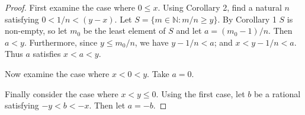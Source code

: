 \documentclass[12pt]{article}
\begin{document}
\begin{proof}
First examine the case where $0 \leq x$.  Using Corollary 2, find a natural $n$ satisfying $0 < 1/n < (y-x)$.  Let $S = \{ m \in \mathbb{N} : m/n \geq y \}$.  By Corollary 1 $S$ is non-empty, so let $m_0$ be the least element of $S$ and let $a = (m_0-1)/n$.  Then $a< y$.  Furthermore, since $y \leq m_0/n$, we have $y - 1/n < a$; and $x < y - 1/n < a$.  Thus $a$ satisfies $x < a < y$.

Now examine the case where $x < 0 < y$.  Take $a = 0$.

Finally consider the case where $x < y \leq 0$.  Using the first case, let $b$ be a rational satisfying $-y < b < -x$.  Then let $a = -b$.
\end{proof}
\end{document}
